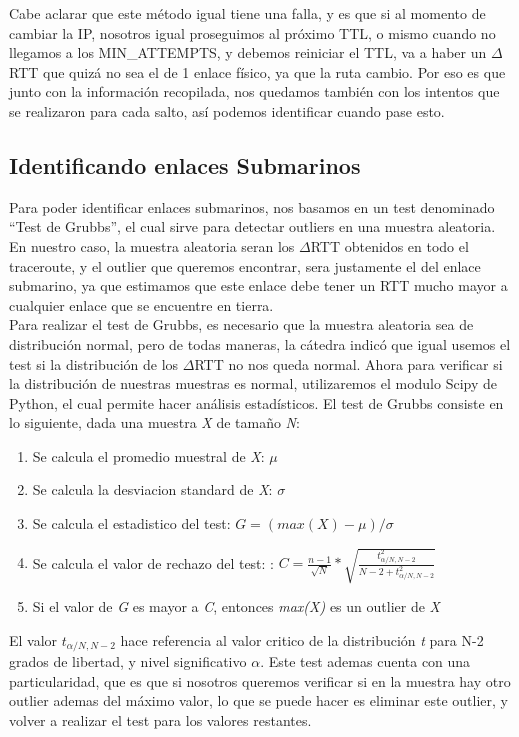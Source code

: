 Cabe aclarar que este método igual tiene una falla, y es que si al momento de cambiar la IP, nosotros igual proseguimos al próximo TTL, o mismo cuando no llegamos a los MIN\_ATTEMPTS, y debemos reiniciar el TTL, va a haber un $\Delta$RTT que quizá no sea el de 1 enlace físico, ya que la ruta cambio. Por eso es que junto con la información recopilada, nos quedamos también con los intentos que se realizaron para cada salto, así podemos identificar cuando pase esto.

\subsection{Identificando enlaces Submarinos}

Para poder identificar enlaces submarinos, nos basamos en un test denominado ``Test de Grubbs'', el cual sirve para detectar outliers en una muestra aleatoria. En nuestro caso, la muestra aleatoria seran los $\Delta$RTT obtenidos en todo el traceroute, y el outlier que queremos encontrar, sera justamente el del enlace submarino, ya que estimamos que este enlace debe tener un RTT mucho mayor a cualquier enlace que se encuentre en tierra.\\ 

Para realizar el test de Grubbs, es necesario que la muestra aleatoria sea de distribución normal, pero de todas maneras, la cátedra indicó que igual usemos el test si la distribución de los $\Delta$RTT no nos queda normal. Ahora para verificar si la distribución de nuestras muestras es normal, utilizaremos el modulo Scipy de Python, el cual permite hacer análisis estadísticos. El test de Grubbs consiste en lo siguiente, dada una muestra \textit{X} de tamaño \textit{N}:

\begin{enumerate}
	\item Se calcula el promedio muestral de \textit{X}: $\mu$
	\item Se calcula la desviacion standard de \textit{X}: $\sigma$
	\item Se calcula el estadistico del test: $G = (max(X) - \mu) / \sigma$
	\item Se calcula el valor de rechazo del test: : $C = \frac{n-1}{\sqrt{N}} * \sqrt{\frac{t_{\alpha/N,N-2}^2}{N-2+t_{\alpha/N,N-2}^2}}$
	\item Si el valor de \textit{G} es mayor a \textit{C}, entonces \textit{max(X)} es un outlier de \textit{X}
\end{enumerate}

El valor $t_{\alpha/N,N-2}$ hace referencia al valor critico de la distribución \textit{t} para N-2 grados de libertad, y nivel significativo $\alpha$. Este test ademas cuenta con una particularidad, que es que si nosotros queremos verificar si en la muestra hay otro outlier ademas del máximo valor, lo que se puede hacer es eliminar este outlier, y volver a realizar el test para los valores restantes.

